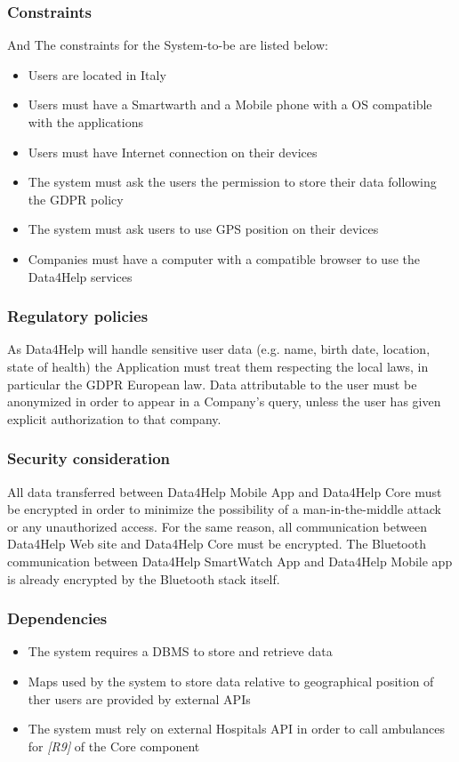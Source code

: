 \subsubsection{Constraints}And
The constraints for the System-to-be are listed below:
\begin{itemize}
    \item Users are located in Italy
    \item Users must have a Smartwarth and a Mobile phone with a OS compatible with the applications
    \item Users must have Internet connection on their devices
    \item The system must ask the users the permission to store their data following the GDPR policy
    \item The system must ask users to use GPS position on their devices
    \item Companies must have a computer with a compatible browser to use the Data4Help services
\end{itemize}

\subsubsection{Regulatory policies}
As Data4Help will handle sensitive user data (e.g. name, birth date, location, state of health) the Application must treat them respecting the local laws, in particular the GDPR European law. Data attributable to the user must be anonymized in order to appear in a Company's query, unless the user has given explicit authorization to that company.

\subsubsection{Security consideration}
All data transferred between Data4Help Mobile App and Data4Help Core must be encrypted in order to minimize the possibility of a man-in-the-middle attack or any unauthorized access.
For the same reason, all communication between Data4Help Web site and Data4Help Core must be encrypted.
The Bluetooth communication between Data4Help SmartWatch App and Data4Help Mobile app is already encrypted by the Bluetooth stack itself.

\subsubsection{Dependencies}
\begin{itemize}
    \item The system requires a DBMS to store and retrieve data
    \item Maps used by the system to store data relative to geographical position of ther users are provided by external APIs
    \item The system must rely on external Hospitals API in order to call ambulances for \textit{[R9]} of the Core component
\end{itemize}
